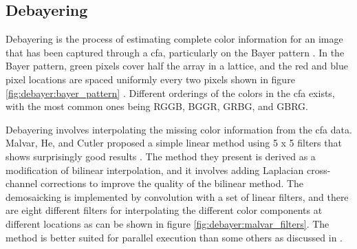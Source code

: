 \subsection{Debayering}
Debayering is the process of estimating complete color information for an image that has been captured through a \gls{cfa}, particularly on the Bayer pattern \cite{getreuerMalvarHeCutlerLinearImage2011}.
In the Bayer pattern, green pixels cover half the array in a lattice, and the red and blue pixel locations are spaced uniformly every two pixels shown in figure \ref{fig:debayer:bayer_pattern} \cite{getreuerMalvarHeCutlerLinearImage2011}.
Different orderings of the colors in the \gls{cfa} exists, with the most common ones being RGGB, BGGR, GRBG, and GBRG.

Debayering involves interpolating the missing color information from the \gls{cfa} data.
Malvar, He, and Cutler proposed a simple linear method using 5 x 5 filters that shows surprisingly good results \cite{getreuerMalvarHeCutlerLinearImage2011}.
The method they present is derived as a modification of bilinear interpolation, and it involves adding Laplacian cross-channel corrections to improve the quality of the bilinear method.
The demosaicking is implemented by convolution with a set of linear filters, and there are eight different filters for interpolating the different color components at different locations as can be shown in figure \ref{fig:debayer:malvar_filters}.
The method is better suited for parallel execution than some others as discussed in \todo.


